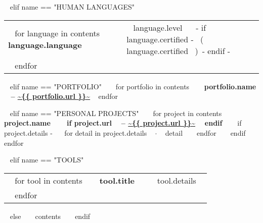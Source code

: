 \begin{minipage}{\textwidth}
~{ elif name == "HUMAN LANGUAGES" }~
  \begin{tabular}{ @{} p{32mm} p{135mm} @{} }
  ~{ for language in contents }~
    \bf {~{{ language.language }}~} & {\small ~{{ language.level }}~ ~{- if language.certified -}~ \small\color{maingrey}\hspace{1mm}(~{{ language.certified }}~)~{- endif -}~} \\
  ~{ endfor }~
  \end{tabular}
  \vspace{50mm}


~{ elif name == "PORTFOLIO" }~
  ~{ for portfolio in contents }~
    {\bf ~{{ portfolio.name }}~ -- \color{maincolor}\url{~{{ portfolio.url }}~} }
    \vspace{1mm}
  ~{ endfor }~
  \vspace{5mm}


~{ elif name == "PERSONAL PROJECTS" }~
  ~{ for project in contents }~
    {\small\bf ~{{ project.name }}~ ~{ if project.url }~ -- \color{maincolor}\url{~{{ project.url }}~} ~{ endif }~ }
    \vspace{1mm}
    ~{ if project.details -}~
    ~{ for detail in project.details }~
      $\cdot$ \small ~{{ detail }}~
    ~{ endfor }~
    ~{ endif }~
    \vspace{3mm}
  ~{ endfor }~
  \vspace{15mm}


~{ elif name == "TOOLS" }~
  \begin{tabular}{ @{} p{32mm} p{135mm} @{} }
  ~{ for tool in contents }~
    \bf\small ~{{ tool.title }}~ & {\small ~{{ tool.details }}~} \\
  ~{ endfor }~
  \end{tabular}
  \vspace{10mm}
~{ else }~
  ~{{ contents }}~
  \bigskip
~{ endif }~
\end{minipage}
